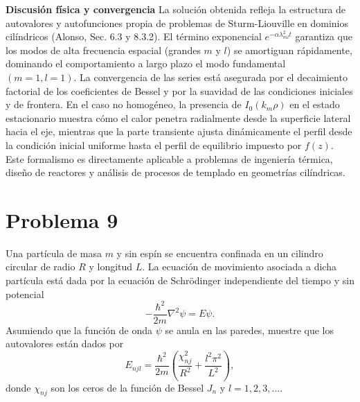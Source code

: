 \documentclass[a4paper]{article}
\begin{document}
\textbf{Discusión física y convergencia}
La solución obtenida refleja la estructura de autovalores y autofunciones propia de problemas de Sturm-Liouville en dominios cilíndricos (Alonso, Sec. 6.3 y 8.3.2). El término exponencial $e^{-\alpha \lambda_{ml}^2 t}$ garantiza que los modos de alta frecuencia espacial (grandes $m$ y $l$) se amortiguan rápidamente, dominando el comportamiento a largo plazo el modo fundamental $(m=1, l=1)$. La convergencia de las series está asegurada por el decaimiento factorial de los coeficientes de Bessel y por la suavidad de las condiciones iniciales y de frontera. En el caso no homogéneo, la presencia de $I_0(k_m \rho)$ en el estado estacionario muestra cómo el calor penetra radialmente desde la superficie lateral hacia el eje, mientras que la parte transiente ajusta dinámicamente el perfil desde la condición inicial uniforme hasta el perfil de equilibrio impuesto por $f(z)$. Este formalismo es directamente aplicable a problemas de ingeniería térmica, diseño de reactores y análisis de procesos de templado en geometrías cilíndricas.


\section{Problema 9}
Una partícula de masa $m$ y sin espín se encuentra confinada en un cilindro circular de radio $R$ y longitud $L$. La ecuación de movimiento asociada a dicha partícula está dada por la ecuación de Schrödinger independiente del tiempo y sin potencial
$$-\frac{\hbar^2}{2m}\nabla^2\psi = E\psi.$$
Asumiendo que la función de onda $\psi$ se anula en las paredes, muestre que los autovalores están dados por
$$E_{njl} = \frac{\hbar^2}{2m}\left(\frac{\chi_{nj}^2}{R^2} + \frac{l^2\pi^2}{L^2}\right),$$
donde $\chi_{nj}$ son los ceros de la función de Bessel $J_n$ y $l=1,2,3,\dots$.
\end{document}
